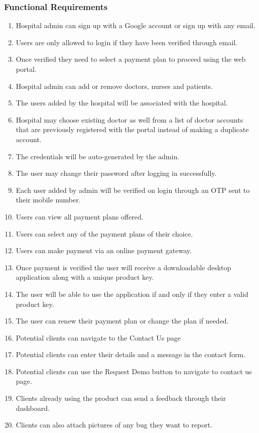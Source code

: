 \subsubsection{Functional Requirements}
\begin{enumerate}
    \item      Hospital admin can sign up with a Google account or sign up with any email.
    \item Users are only allowed to login if they have been verified through email.
    \item Once verified they need to select a payment plan to proceed using the web portal.
    \item Hospital admin can add or remove doctors, nurses and patients.
    \item The users added by the hospital will be associated with the hospital.
    \item Hospital may choose existing doctor as well from a list of doctor accounts that are previously registered with the portal instead of making a duplicate account.
    \item The credentials will be auto-generated by the admin.
    \item The user may change their password after logging in successfully.
    \item Each user added by admin will be verified on login through an OTP sent to their mobile number.
    \item Users can view all payment plans offered.
    \item Users can select any of the payment plans of their choice.
    \item Users can make payment via an online payment gateway.
    \item Once payment is verified the user will receive a downloadable desktop application along with a unique product key.
    \item The user will be able to use the application if and only if they enter a valid product key.
    \item The user can renew their payment plan or change the plan if needed.
    \item Potential clients can navigate to the Contact Us page
    \item Potential clients can enter their details and a message in the contact form.
    \item Potential clients can use the Request Demo button to navigate to contact us page.
    \item Clients already using the product can send a feedback through their dashboard.
    \item Clients can also attach pictures of any bug they want to report.

\end{enumerate}

